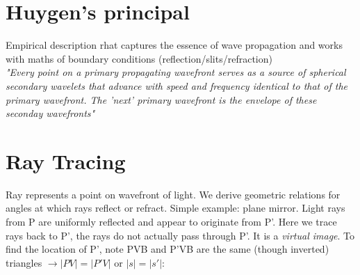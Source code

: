 \documentclass[a4paper, 11pt, normalem]{report}
\begin{document}
\section{Huygen's principal}
Empirical description rhat captures the essence of wave propagation and works with maths of boundary conditions (reflection/slits/refraction) \\
\emph{"Every point on a primary propagating wavefront serves as a source of spherical secondary wavelets that advance with speed and frequency identical to that of the primary wavefront. The 'next' primary wavefront is the envelope of these seconday wavefronts"}

\section{Ray Tracing}
Ray represents a point on wavefront of light.
We derive geometric relations for angles at which rays reflect or refract.
Simple example: plane mirror.
Light rays from P are uniformly reflected and appear to originate from P'.
Here we trace rays back to P', the rays do not actually pass through P'.
It is a \emph{virtual image}.
To find the location of P', note PVB and P'VB are the same (though inverted) triangles $\rightarrow |PV| = |P'V|$ or $|s| = |s'|$:
\end{document}

